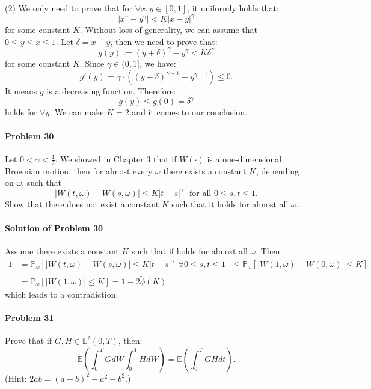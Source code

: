 \documentclass{article}
\begin{document}
(2) We only need to prove that for $\forall x,y\in[0,1]$, it uniformly holds that:
\[|x^{\gamma}-y^{\gamma}|<K|x-y|^{\gamma}\]
for some constant $K$. Without loss of generality, we can assume that $0\leqslant y\leqslant x\leqslant 1$. Let $\delta = x-y$, then we need to prove that:
\[g(y):=(y+\delta)^{\gamma}-y^{\gamma} < K \delta^{\gamma}\]
for some constant $K$. Since $\gamma\in(0,1]$, we have:
\[g'(y)=\gamma\cdot\left((y+\delta)^{\gamma-1}-y^{\gamma-1}\right)\leqslant 0.\]
It means $g$ is a decreasing function. Therefore:
\[g(y)\leqslant g(0) = \delta^{\gamma}\]
holds for $\forall y$. We can make $K=2$ and it comes to our conclusion.


\paragraph{Problem 30} Let $0<\gamma<\frac12$. We showed in Chapter 3 that if $W(\cdot)$ is a one-dimensional Brownian motion, then for almost every $\omega$ there exists a constant $K$, depending on $\omega$, such that 
\[|W(t,\omega)-W(s,\omega)|\leqslant K|t-s|^{\gamma}~~~\text{for all }0\leqslant s,t\leqslant 1.\]
Show that there does not exist a constant $K$ such that it holds for almost all $\omega$. 

\paragraph{Solution of Problem 30} Assume there exists a constant $K$ such that if holds for almost all $\omega$. Then:
\begin{equation*}
\begin{aligned}
1&=\mathbb{P}_{\omega}\left[|W(t,\omega)-W(s,\omega)|\leqslant K|t-s|^{\gamma}~~\forall 0\leqslant s,t\leqslant 1\right] \leqslant \mathbb{P}_{\omega}\left[|W(1,\omega)-W(0,\omega)|\leqslant K\right]\\
&= \mathbb{P}_{\omega}\left[|W(1,\omega)|\leqslant K\right] = 1-2\widetilde{\phi}(K).
\end{aligned}    
\end{equation*}
which leads to a contradiction. 

\paragraph{Problem 31} Prove that if $G,H\in\mathbb{L}^2(0,T)$, then:
\[\mathbb{E}\left(\int_0^T GdW \int_0^T HdW\right) = \mathbb{E}\left(\int_0^T GHdt\right).\]
(Hint: $2ab=(a+b)^2-a^2-b^2$.)
\end{document}
